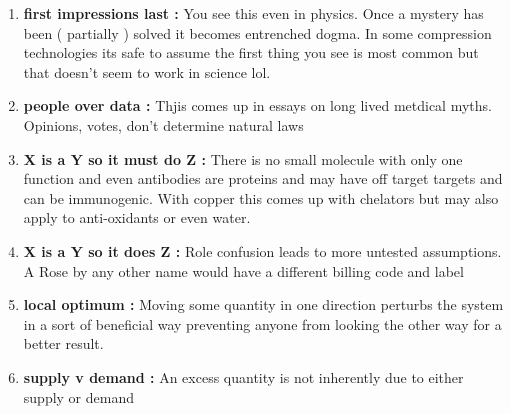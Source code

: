 \begin{mdpicomment}
\newcommand{\myitem}[2]{\item {\bf #1 : } #2 \par}
\begin{enumerate}
\myitem{first impressions last} { You see this even in physics. Once a mystery has been ( partially ) solved it becomes entrenched dogma. In some compression technologies its safe to assume the first thing you see is most common but that doesn't seem to work in science lol.  }
\myitem{people over data} { Thjis comes up in essays on long lived metdical myths. Opinions, votes, don't determine natural laws }
\myitem{X is a Y so it must do Z} {  There is no small molecule with only one function and even antibodies are proteins and may have off target targets and can be immunogenic. With copper this comes up with chelators but may also apply to anti-oxidants or even water.   }
\myitem{X is a Y so it does Z   }{ Role confusion leads to more untested assumptions. A Rose by any other name would have a different billing code and label   }
\myitem{local optimum } { Moving some quantity in one direction perturbs the system in a sort of beneficial way preventing anyone from looking the other way for a better result. }

\myitem{supply v demand}{ An excess quantity is not inherently due to either supply or demand }


\end{enumerate}
\end{mdpicomment}
